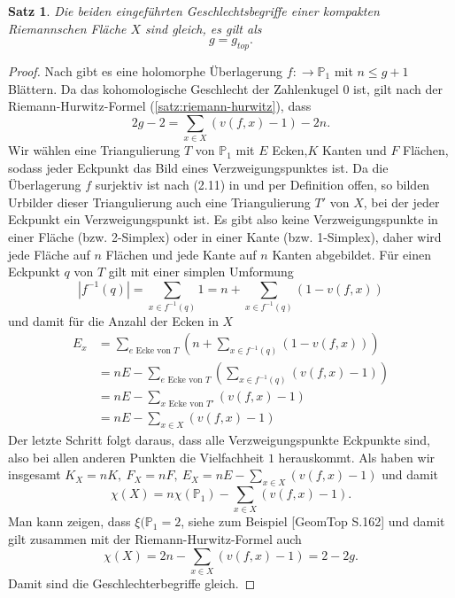 \documentclass[11pt,a4paper,toc=bibliography]{scrartcl}
\theoremstyle{thm}
\newtheorem{satz}{Satz}[section]
\theoremstyle{def}
\theoremstyle{remark}
\begin{document}
\begin{satz}
Die beiden eingeführten Geschlechtsbegriffe einer kompakten Riemannschen Fläche $X$ sind gleich, es gilt als
\[
g=g_{top}.
\]
\end{satz}
\begin{proof}
Nach  gibt es eine holomorphe Überlagerung $f:\rightarrow \mathbb{P}_1$ mit $n\leq g+1$ Blättern. Da das kohomologische Geschlecht der Zahlenkugel $0$ ist, gilt nach der Riemann-Hurwitz-Formel (\ref{satz:riemann-hurwitz}), dass
\[
2g-2=\sum_{x\in X}(v(f,x)-1)-2n.
\]
Wir wählen eine Triangulierung $T$ von $\mathbb{P}_1$ mit $E$ Ecken,$K$ Kanten und $F$ Flächen, sodass jeder Eckpunkt das Bild eines Verzweigungspunktes ist. Da die Überlagerung $f$ surjektiv ist nach (2.11) in \cite[~S.11]{forster} und per Definition offen, so bilden Urbilder dieser Triangulierung auch eine Triangulierung $T'$ von $X$, bei der jeder Eckpunkt ein Verzweigungspunkt ist. Es gibt also keine Verzweigungspunkte in einer Fläche (bzw. 2-Simplex) oder in einer Kante (bzw. 1-Simplex), daher wird jede Fläche auf $n$ Flächen und jede Kante auf $n$ Kanten abgebildet. Für einen Eckpunkt $q$ von $T$ gilt mit einer simplen Umformung
\[
|f^{-1}(q)|=\sum_{x\in f^{-1}(q)} 1 = n + \sum_{x\in f^{-1}(q)}(1-v(f,x))
\]
und damit für die Anzahl der Ecken in $X$
\begin{align*}
    E_x &= \sum_{e \text{ Ecke von } T} \left(  n + \sum_{x\in f^{-1}(q)}(1-v(f,x))\right)\\
        &=n E -\sum_{e \text{ Ecke von } T} \left(\sum_{x\in f^{-1}(q)}(v(f,x)-1)\right)\\
        &=n E-\sum_{x \text{ Ecke von } T'}(v(f,x)-1)\\
        &=n E-\sum_{x\in X}(v(f,x)-1)
\end{align*}
Der letzte Schritt folgt daraus, dass alle Verzweigungspunkte Eckpunkte sind, also bei allen anderen Punkten die Vielfachheit $1$ herauskommt.
Als haben wir insgesamt $K_X=nK,~F_X=nF,~ E_X=n E-\sum_{x\in X}(v(f,x)-1)$ und damit
\[
\chi(X) = n\chi(\mathbb{P}_1)-\sum_{x\in X}(v(f,x)-1).
\]
Man kann zeigen, dass $\xi(\mathbb{P}_1=2$, siehe zum Beispiel [GeomTop S.162] und damit gilt zusammen mit der Riemann-Hurwitz-Formel auch
\[
\chi(X) = 2n-\sum_{x\in X}(v(f,x)-1)= 2-2g.
\]
Damit sind die Geschlechterbegriffe gleich.
\end{proof}
\newpage
\end{document}
